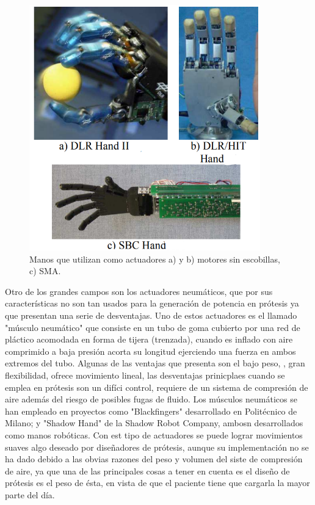 \documentclass{article}
\begin{document}
\begin{figure}[H] %
    \centering
    \includegraphics[width=100mm]{protesis 3.png} %
    \caption{Manos que utilizan como actuadores a) y b) motores sin escobillas, c) SMA\cite{ff2}.}
    \label{grafica:seis}
\end{figure}


Otro de los grandes campos son los actuadores neumáticos, que por sus características no son tan usados para la generación de potencia en prótesis ya que presentan una serie de desventajas. Uno de estos actuadores es el llamado "músculo neumático" que consiste en un tubo de goma cubierto por una red de pláctico acomodada en forma de tijera (trenzada), cuando es inflado con aire comprimido a baja presión acorta su longitud ejerciendo una fuerza en ambos extremos del tubo. Algunas de las ventajas que presenta son el bajo peso, , gran flexibilidad, ofrece movimiento lineal, las desventajas prinicplaes cuando se emplea en prótesis son un difíci control, requiere de un sistema de compresión de aire además del riesgo de posibles fugas de fluido. Los músculos neumáticos se han empleado en proyectos como "Blackfingers" desarrollado en Politécnico de Milano; y "Shadow Hand" de la Shadow Robot Company, ambosn desarrollados como manos robóticas. Con est tipo de actuadores se puede lograr movimientos suaves algo deseado por diseñadores de prótesis, aunque su implementación no se ha dado debido a las obvias razones del peso y volumen del siste de compresión de aire, ya que una de las principales cosas a tener en cuenta es el diseño de prótesis  es el peso de ésta, en vista de que el paciente tiene que cargarla la mayor parte del día\cite{ff2}. 
\end{document}
